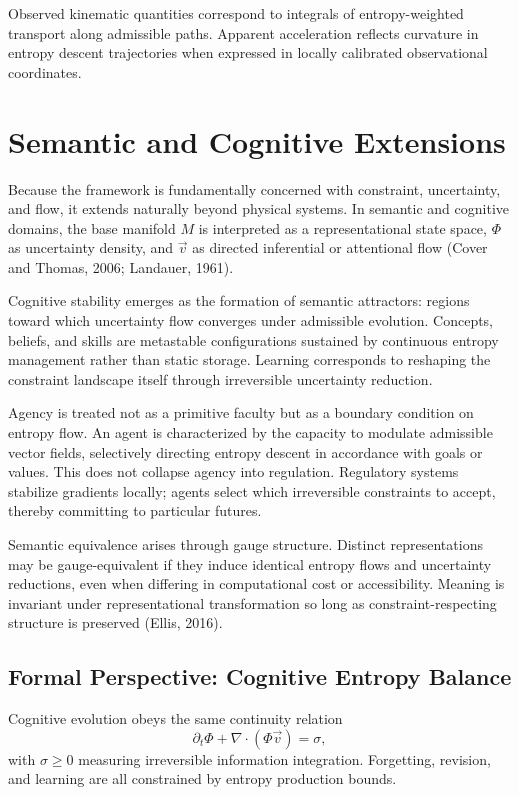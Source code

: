 \documentclass[11pt]{article}
\begin{document}
Observed kinematic quantities correspond to integrals of entropy-weighted transport along admissible paths. Apparent acceleration reflects curvature in entropy descent trajectories when expressed in locally calibrated observational coordinates.

\section{Semantic and Cognitive Extensions}

Because the framework is fundamentally concerned with constraint, uncertainty, and flow, it extends naturally beyond physical systems. In semantic and cognitive domains, the base manifold $M$ is interpreted as a representational state space, $\Phi$ as uncertainty density, and $\vec{v}$ as directed inferential or attentional flow (Cover and Thomas, 2006; Landauer, 1961).

Cognitive stability emerges as the formation of semantic attractors: regions toward which uncertainty flow converges under admissible evolution. Concepts, beliefs, and skills are metastable configurations sustained by continuous entropy management rather than static storage. Learning corresponds to reshaping the constraint landscape itself through irreversible uncertainty reduction.

Agency is treated not as a primitive faculty but as a boundary condition on entropy flow. An agent is characterized by the capacity to modulate admissible vector fields, selectively directing entropy descent in accordance with goals or values. This does not collapse agency into regulation. Regulatory systems stabilize gradients locally; agents select which irreversible constraints to accept, thereby committing to particular futures.

Semantic equivalence arises through gauge structure. Distinct representations may be gauge-equivalent if they induce identical entropy flows and uncertainty reductions, even when differing in computational cost or accessibility. Meaning is invariant under representational transformation so long as constraint-respecting structure is preserved (Ellis, 2016).

\subsection*{Formal Perspective: Cognitive Entropy Balance}

Cognitive evolution obeys the same continuity relation
\[
\partial_t \Phi + \nabla \cdot (\Phi \vec{v}) = \sigma,
\]
with $\sigma \ge 0$ measuring irreversible information integration. Forgetting, revision, and learning are all constrained by entropy production bounds.
\end{document}
